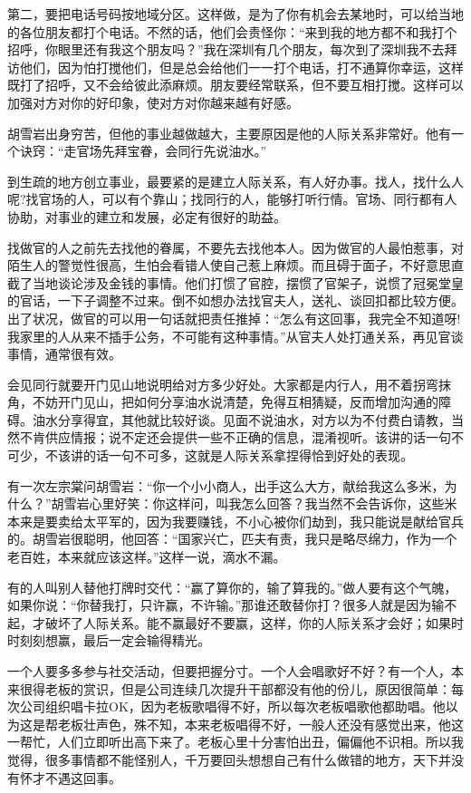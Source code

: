 \documentclass[fontset=fandol, a4paper, 12pt, openright]{ctexbook}
\begin{document}
第二，要把电话号码按地域分区。这样做，是为了你有机会去某地时，可以给当地的各位朋友都打个电话。不然的话，他们会责怪你：“来到我的地方都不和我打个招呼，你眼里还有我这个朋友吗？”我在深圳有几个朋友，每次到了深圳我不去拜访他们，因为怕打搅他们，但是总会给他们一一打个电话，打不通算你幸运，这样既打了招呼，又不会给彼此添麻烦。朋友要经常联系，但不要互相打搅。这样可以加强对方对你的好印象，使对方对你越来越有好感。

胡雪岩出身穷苦，但他的事业越做越大，主要原因是他的人际关系非常好。他有一个诀窍：“走官场先拜宝眷，会同行先说油水。”

到生疏的地方创立事业，最要紧的是建立人际关系，有人好办事。找人，找什么人呢?找官场的人，可以有个靠山；找同行的人，能够打听行情。官场、同行都有人协助，对事业的建立和发展，必定有很好的助益。

找做官的人之前先去找他的眷属，不要先去找他本人。因为做官的人最怕惹事，对陌生人的警觉性很高，生怕会看错人使自己惹上麻烦。而且碍于面子，不好意思直截了当地谈论涉及金钱的事情。他们打惯了官腔，摆惯了官架子，说惯了冠冕堂皇的官话，一下子调整不过来。倒不如想办法找官夫人，送礼、谈回扣都比较方便。出了状况，做官的可以用一句话就把责任推掉：“怎么有这回事，我完全不知道呀!我家里的人从来不插手公务，不可能有这种事情。”从官夫人处打通关系，再见官谈事情，通常很有效。

会见同行就要开门见山地说明给对方多少好处。大家都是内行人，用不着拐弯抹角，不妨开门见山，把如何分享油水说清楚，免得互相猜疑，反而增加沟通的障碍。油水分享得宜，其他就比较好谈。见面不说油水，对方以为不付费白请教，当然不肯供应情报；说不定还会提供一些不正确的信息，混淆视听。该讲的话一句不可少，不该讲的话一句不可多，这就是人际关系拿捏得恰到好处的表现。

有一次左宗棠问胡雪岩：“你一个小小商人，出手这么大方，献给我这么多米，为什么？”胡雪岩心里好笑：你这样问，叫我怎么回答？我当然不会告诉你，这些米本来是要卖给太平军的，因为我要赚钱，不小心被你们劫到，我只能说是献给官兵的。胡雪岩很聪明，他回答：“国家兴亡，匹夫有责，我只是略尽绵力，作为一个老百姓，本来就应该这样。”这样一说，滴水不漏。

有的人叫别人替他打牌时交代：“赢了算你的，输了算我的。”做人要有这个气魄，如果你说：“你替我打，只许赢，不许输。”那谁还敢替你打？很多人就是因为输不起，才破坏了人际关系。能不赢最好不要赢，这样，你的人际关系才会好；如果时时刻刻想赢，最后一定会输得精光。

一个人要多多参与社交活动，但要把握分寸。一个人会唱歌好不好？有一个人，本来很得老板的赏识，但是公司连续几次提升干部都没有他的份儿，原因很简单：每次公司组织唱卡拉OK，因为老板歌唱得不好，所以每次老板唱歌他都助唱。他以为这是帮老板壮声色，殊不知，本来老板唱得不好，一般人还没有感觉出来，他这一帮忙，人们立即听出高下来了。老板心里十分害怕出丑，偏偏他不识相。所以我觉得，很多事情都不能怪别人，千万要回头想想自己有什么做错的地方，天下并没有怀才不遇这回事。
\end{document}
